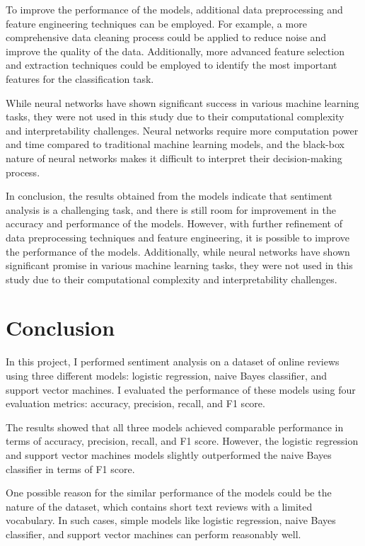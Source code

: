 \documentclass{article}
\begin{document}
To improve the performance of the models, additional data preprocessing and feature engineering techniques can be employed. For example, a more comprehensive data cleaning process could be applied to reduce noise and improve the quality of the data. Additionally, more advanced feature selection and extraction techniques could be employed to identify the most important features for the classification task.

While neural networks have shown significant success in various machine learning tasks, they were not used in this study due to their computational complexity and interpretability challenges. Neural networks require more computation power and time compared to traditional machine learning models, and the black-box nature of neural networks makes it difficult to interpret their decision-making process.

In conclusion, the results obtained from the models indicate that sentiment analysis is a challenging task, and there is still room for improvement in the accuracy and performance of the models. However, with further refinement of data preprocessing techniques and feature engineering, it is possible to improve the performance of the models. Additionally, while neural networks have shown significant promise in various machine learning tasks, they were not used in this study due to their computational complexity and interpretability challenges.


\section{Conclusion}

In this project, I performed sentiment analysis on a dataset of online reviews using three different models: logistic regression, naive Bayes classifier, and support vector machines. I evaluated the performance of these models using four evaluation metrics: accuracy, precision, recall, and F1 score.

The results showed that all three models achieved comparable performance in terms of accuracy, precision, recall, and F1 score. However, the logistic regression and support vector machines models slightly outperformed the naive Bayes classifier in terms of F1 score.

One possible reason for the similar performance of the models could be the nature of the dataset, which contains short text reviews with a limited vocabulary. In such cases, simple models like logistic regression, naive Bayes classifier, and support vector machines can perform reasonably well.
\end{document}
